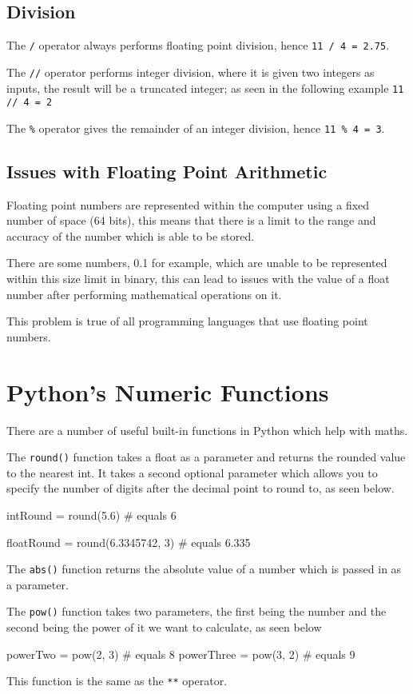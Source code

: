 \subsection*{Division}
The \verb|/| operator always performs floating point division, hence \verb|11 / 4 = 2.75|.

The \verb|//| operator  performs integer division, where it is given two integers as inputs, the result will be a truncated integer; as seen in the following example \verb|11 // 4 = 2|

The \verb|%| operator gives the remainder of an integer division, hence \verb|11 % 4 = 3|.

\subsection*{Issues with Floating Point Arithmetic}
Floating point numbers are represented within the computer using a fixed number of space (64 bits), this means that there is a limit to the range and accuracy of the number which is able to be stored.

There are some numbers, 0.1 for example, which are unable to be represented within this size limit in binary, this can lead to issues with the value of a float number after performing mathematical operations on it.

This problem is true of all programming languages that use floating point numbers. 

\section*{Python's Numeric Functions}
There are a number of useful built-in functions in Python which help with maths.

The \verb|round()| function takes a float as a parameter and returns the rounded value to the nearest int. It takes a second optional parameter which allows you to specify the number of digits after the decimal point to round to, as seen below.
\begin{python}
intRound = round(5.6) # equals 6

floatRound = round(6.3345742, 3) # equals 6.335
\end{python}

The \verb|abs()| function returns the absolute value of a number which is passed in as a parameter.

The \verb|pow()| function takes two parameters, the first being the number and the second being the power of it we want to calculate, as seen below
\begin{python}
powerTwo = pow(2, 3) # equals 8
powerThree = pow(3, 2) # equals 9
\end{python}
This function is the same as the \verb|**| operator.

